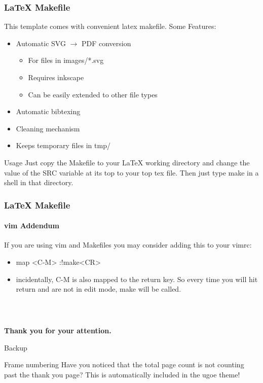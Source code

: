 \documentclass[10pt]{beamer}
\begin{document}
\begin{frame}
  \frametitle{\LaTeX{} Makefile}
  This template comes with convenient latex makefile. Some Features:
  \begin{itemize}
    \item 
      Automatic SVG $\rightarrow$ PDF conversion
      \begin{itemize}
        \item 
          For files in images/*.svg
        \item
          Requires inkscape
        \item
          Can be easily extended to other file types
      \end{itemize}
    \item
      Automatic bibtexing
    \item
      Cleaning mechanism
    \item
      Keeps temporary files in tmp/
  \end{itemize}
  \begin{exampleblock}{Usage}
    Just copy the Makefile to your \LaTeX{} working directory and change
    the value of the SRC variable at its top to your top tex file. Then
    just type make in a shell in that directory.
  \end{exampleblock}
\end{frame}

\begin{frame}
  \frametitle{\LaTeX{} Makefile}
  \framesubtitle{vim Addendum}
  If you are using vim and Makefiles you may consider adding this to your 
  vimrc:
  \begin{itemize}
    \item 
      map <C-M> :!make<CR>
    \item
      incidentally, C-M is also mapped to the return key. So every time
      you will hit return and are not in edit mode, make will be called.
  \end{itemize}
\end{frame}

\appendix
\begin{frame}
  \frametitle{~}
  \begin{center}
    \textbf{\Large Thank you for your attention.}
  \end{center}
\end{frame}

\begin{frame}
  \begin{center}
    \Huge Backup
  \end{center}
\end{frame}

\begin{frame}
  \begin{alertblock}{Frame numbering}
    Have you noticed that the total page count is not counting past the thank 
    you page? This is automatically included in the ugoe theme!
  \end{alertblock}
\end{frame}
\end{document}
